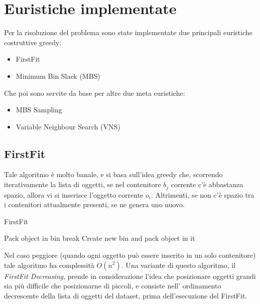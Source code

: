 \documentclass{article}
\begin{document}
\section{Euristiche implementate}
Per la risoluzione del problema sono state implementate due principali euristiche costruttive greedy:

\begin{itemize}
\item FirstFit
\item Minimum Bin Slack (MBS)
\end{itemize}

Che poi sono servite da base per altre due meta euristiche:

\begin{itemize}
\item MBS Sampling
\item Variable Neighbour Search (VNS)
\end{itemize} 
\newpage
\subsection{FirstFit}
Tale algoritmo è molto banale, e si basa sull'idea greedy che, scorrendo iterativamente la lista di oggetti, se nel contenitore $b_j$ corrente c'è abbastanza spazio, allora vi si inserisce l'oggetto corrente $o_i$. Altrimenti, se non c'è spazio tra i contenitori attualmente presenti, se ne genera uno nuovo.
\newline
\begin{algorithm}[h]
\caption{FirstFit}\label{FirstFit}
\begin{algorithmic}[1]
\State Pack object in bin
\State break
\EndIf
{}
\EndFor
{}
\State Create new bin and pack object in it
\EndIf 
{}
\EndFor
{}
\end{algorithmic}
\end{algorithm}
\newline
\newline
\newline
Nel caso peggiore (quando ogni oggetto può essere inserito in un solo contenitore) tale algoritmo ha complessità $O(n^2)$.
\newline
\newline
Una variante di questo algoritmo, il \textit{FirstFit Decreasing}, prende in considerazione l'idea che posizionare oggetti grandi sia più difficile che posizionarne di piccoli, e consiste nell' ordinamento decrescente della lista di oggetti del dataset, prima dell'esecuzione del FirstFit. 
\newline
\newline
\end{document}
